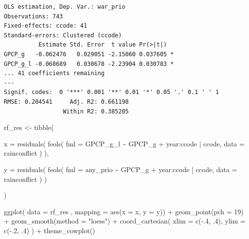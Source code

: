 \documentclass[
  a4paper,
  DIV=11,
  oneside]{scrreprt}
\newenvironment{Shaded}{\begin{snugshade}}{\end{snugshade}}
\newcommand{\AttributeTok}[1]{\textcolor[rgb]{0.40,0.45,0.13}{#1}}
\newcommand{\DecValTok}[1]{\textcolor[rgb]{0.68,0.00,0.00}{#1}}
\newcommand{\FunctionTok}[1]{\textcolor[rgb]{0.28,0.35,0.67}{#1}}
\newcommand{\NormalTok}[1]{\textcolor[rgb]{0.00,0.23,0.31}{#1}}
\newcommand{\OtherTok}[1]{\textcolor[rgb]{0.00,0.23,0.31}{#1}}
\newcommand{\SpecialCharTok}[1]{\textcolor[rgb]{0.37,0.37,0.37}{#1}}
\newcommand{\StringTok}[1]{\textcolor[rgb]{0.13,0.47,0.30}{#1}}
\begin{document}
\begin{verbatim}
OLS estimation, Dep. Var.: war_prio
Observations: 743
Fixed-effects: ccode: 41
Standard-errors: Clustered (ccode) 
          Estimate Std. Error  t value Pr(>|t|)    
GPCP_g   -0.062476   0.029051 -2.15060 0.037605 *  
GPCP_g_l -0.068689   0.030678 -2.23904 0.030783 *  
... 41 coefficients remaining
---
Signif. codes:  0 '***' 0.001 '**' 0.01 '*' 0.05 '.' 0.1 ' ' 1
RMSE: 0.204541     Adj. R2: 0.661198
                 Within R2: 0.385205
\end{verbatim}

\begin{Shaded}
\begin{Highlighting}[]
\NormalTok{rf\_res }\OtherTok{\textless{}{-}} \FunctionTok{tibble}\NormalTok{(}
  
  \AttributeTok{x =} \FunctionTok{residuals}\NormalTok{(}
    \FunctionTok{feols}\NormalTok{(}
      \AttributeTok{fml =}\NormalTok{ GPCP\_g\_l }\SpecialCharTok{\textasciitilde{}}\NormalTok{ GPCP\_g}
      \SpecialCharTok{+}\NormalTok{ year}\SpecialCharTok{:}\NormalTok{ccode}
      \SpecialCharTok{|}\NormalTok{ ccode,}
      \AttributeTok{data =}\NormalTok{ rainconflict}
\NormalTok{    )}
\NormalTok{  ),}
  
  \AttributeTok{y =} \FunctionTok{residuals}\NormalTok{(}
    \FunctionTok{feols}\NormalTok{(}
      \AttributeTok{fml =}\NormalTok{ any\_prio }\SpecialCharTok{\textasciitilde{}}\NormalTok{ GPCP\_g}
      \SpecialCharTok{+}\NormalTok{ year}\SpecialCharTok{:}\NormalTok{ccode}
      \SpecialCharTok{|}\NormalTok{ ccode,}
      \AttributeTok{data =}\NormalTok{ rainconflict}
\NormalTok{    )}
\NormalTok{  )}
  
\NormalTok{)}
\end{Highlighting}
\end{Shaded}

\begin{Shaded}
\begin{Highlighting}[]
\FunctionTok{ggplot}\NormalTok{(}
  \AttributeTok{data =}\NormalTok{ rf\_res , }
  \AttributeTok{mapping =} \FunctionTok{aes}\NormalTok{(}\AttributeTok{x =}\NormalTok{ x, }\AttributeTok{y =}\NormalTok{ y)) }\SpecialCharTok{+}
  \FunctionTok{geom\_point}\NormalTok{(}\AttributeTok{pch =} \DecValTok{19}\NormalTok{) }\SpecialCharTok{+}
  \FunctionTok{geom\_smooth}\NormalTok{(}\AttributeTok{method =} \StringTok{"loess"}\NormalTok{) }\SpecialCharTok{+}
  \FunctionTok{coord\_cartesian}\NormalTok{(}
    \AttributeTok{xlim =} \FunctionTok{c}\NormalTok{(}\SpecialCharTok{{-}}\NormalTok{.}\DecValTok{4}\NormalTok{, .}\DecValTok{4}\NormalTok{), }
    \AttributeTok{ylim =} \FunctionTok{c}\NormalTok{(}\SpecialCharTok{{-}}\NormalTok{.}\DecValTok{2}\NormalTok{, .}\DecValTok{4}\NormalTok{)}
\NormalTok{  ) }\SpecialCharTok{+}
  \FunctionTok{theme\_cowplot}\NormalTok{()}
\end{Highlighting}
\end{Shaded}
\end{document}
